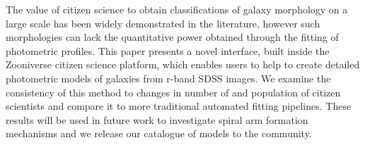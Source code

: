 \documentclass[../main.tex]{subfiles}
\begin{document}
The value of citizen science to obtain classifications of galaxy morphology on a large scale has been widely demonstrated in the literature, however such morphologies can lack the quantitative power obtained through the fitting of photometric profiles. This paper presents a novel interface, built inside the Zooniverse citizen science platform, which enables users to help to create detailed photometric models of galaxies from r-band SDSS images. We examine the consistency of this method to changes in number of and population of citizen scientists and compare it to more traditional automated fitting pipelines. These results will be used in future work to investigate spiral arm formation mechanisms and we release our catalogue of models to the community.
\end{document}
